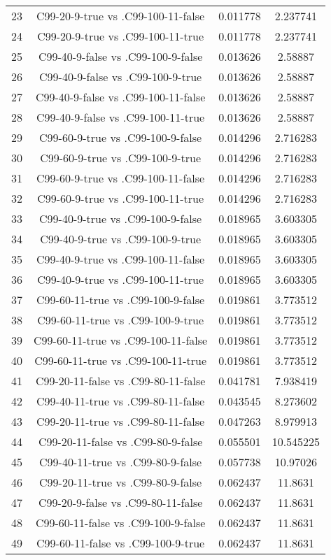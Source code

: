 \documentclass[a4paper,10pt]{article}
\begin{document}
\begin{landscape}
\begin{table}[!htp]
\begin{tabular}{cccc}
23&C99-20-9-true vs .C99-100-11-false&0.011778&2.237741\\
24&C99-20-9-true vs .C99-100-11-true&0.011778&2.237741\\
25&C99-40-9-false vs .C99-100-9-false&0.013626&2.58887\\
26&C99-40-9-false vs .C99-100-9-true&0.013626&2.58887\\
27&C99-40-9-false vs .C99-100-11-false&0.013626&2.58887\\
28&C99-40-9-false vs .C99-100-11-true&0.013626&2.58887\\
29&C99-60-9-true vs .C99-100-9-false&0.014296&2.716283\\
30&C99-60-9-true vs .C99-100-9-true&0.014296&2.716283\\
31&C99-60-9-true vs .C99-100-11-false&0.014296&2.716283\\
32&C99-60-9-true vs .C99-100-11-true&0.014296&2.716283\\
33&C99-40-9-true vs .C99-100-9-false&0.018965&3.603305\\
34&C99-40-9-true vs .C99-100-9-true&0.018965&3.603305\\
35&C99-40-9-true vs .C99-100-11-false&0.018965&3.603305\\
36&C99-40-9-true vs .C99-100-11-true&0.018965&3.603305\\
37&C99-60-11-true vs .C99-100-9-false&0.019861&3.773512\\
38&C99-60-11-true vs .C99-100-9-true&0.019861&3.773512\\
39&C99-60-11-true vs .C99-100-11-false&0.019861&3.773512\\
40&C99-60-11-true vs .C99-100-11-true&0.019861&3.773512\\
41&C99-20-11-false vs .C99-80-11-false&0.041781&7.938419\\
42&C99-40-11-true vs .C99-80-11-false&0.043545&8.273602\\
43&C99-20-11-true vs .C99-80-11-false&0.047263&8.979913\\
44&C99-20-11-false vs .C99-80-9-false&0.055501&10.545225\\
45&C99-40-11-true vs .C99-80-9-false&0.057738&10.97026\\
46&C99-20-11-true vs .C99-80-9-false&0.062437&11.8631\\
47&C99-20-9-false vs .C99-80-11-false&0.062437&11.8631\\
48&C99-60-11-false vs .C99-100-9-false&0.062437&11.8631\\
49&C99-60-11-false vs .C99-100-9-true&0.062437&11.8631\\

\end{tabular}
\end{table}
\end{landscape}
\end{document}
